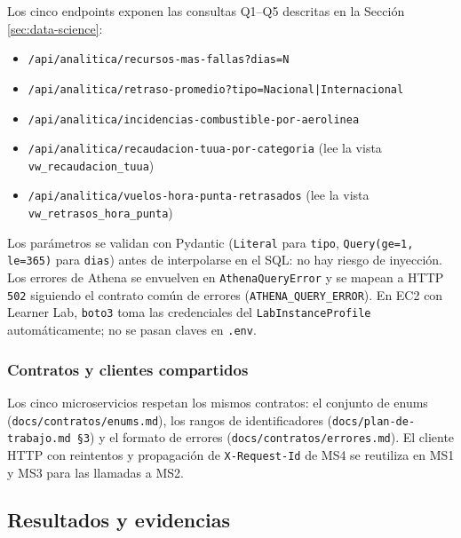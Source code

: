Los cinco endpoints exponen las consultas Q1--Q5 descritas en la
Sección \ref{sec:data-science}:

\begin{itemize}
  \item \texttt{/api/analitica/recursos-mas-fallas?dias=N}
  \item \texttt{/api/analitica/retraso-promedio?tipo=Nacional|Internacional}
  \item \texttt{/api/analitica/incidencias-combustible-por-aerolinea}
  \item \texttt{/api/analitica/recaudacion-tuua-por-categoria}
    (lee la vista \texttt{vw\_recaudacion\_tuua})
  \item \texttt{/api/analitica/vuelos-hora-punta-retrasados}
    (lee la vista \texttt{vw\_retrasos\_hora\_punta})
\end{itemize}

Los parámetros se validan con Pydantic (\texttt{Literal} para
\texttt{tipo}, \texttt{Query(ge=1, le=365)} para \texttt{dias}) antes de
interpolarse en el SQL: no hay riesgo de inyección. Los errores de
Athena se envuelven en \texttt{AthenaQueryError} y se mapean a HTTP
\texttt{502} siguiendo el contrato común de errores
(\texttt{ATHENA\_QUERY\_ERROR}). En EC2 con Learner Lab, \texttt{boto3}
toma las credenciales del \texttt{LabInstanceProfile} automáticamente;
no se pasan claves en \texttt{.env}.

\subsubsection{Contratos y clientes compartidos}
Los cinco microservicios respetan los mismos contratos: el conjunto de
enums (\texttt{docs/contratos/enums.md}), los rangos de identificadores
(\texttt{docs/plan-de-trabajo.md \S3}) y el formato de errores
(\texttt{docs/contratos/errores.md}). El cliente HTTP con reintentos y
propagación de \texttt{X-Request-Id} de MS4 se reutiliza en MS1 y MS3
para las llamadas a MS2.

\subsection{Resultados y evidencias}

